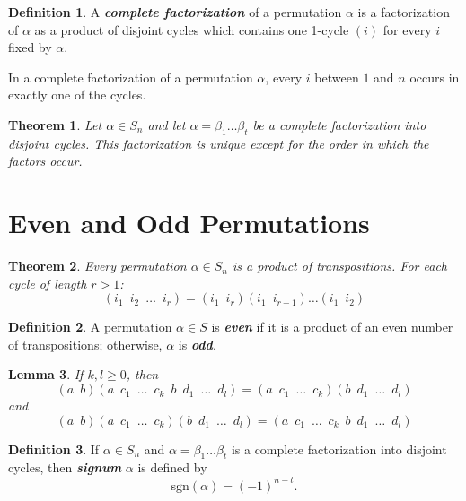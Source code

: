 \documentclass[12pt]{report}
\newtheorem{theorem}{Theorem}[chapter]
\newtheorem{lemma}[theorem]{Lemma}
\theoremstyle{definition}
\newtheorem*{definition}{Definition}
\newcommand{\term}[1]{\textbf{\textit{#1}}}
\begin{document}
\begin{definition}
	A \term{complete factorization} of a permutation $\alpha$ is a factorization of $\alpha$ as a product of disjoint cycles which contains one 1-cycle $(i)$ for every $i$ fixed by $\alpha$.
	\smallskip

	In a complete factorization of a permutation $\alpha$, every $i$ between $1$ and $n$ occurs in exactly one of the cycles.
\end{definition}

\begin{theorem}
	Let $\alpha\in S_n$ and let $\alpha=\beta_1\dots\beta_t$ be a complete factorization into disjoint cycles. This factorization is unique except for the order in which the factors occur.
\end{theorem}

\section{Even and Odd Permutations}
\begin{theorem}
	Every permutation $\alpha\in S_n$ is a product of transpositions. For each cycle of length $r>1$:
	\[ (i_1\enspace i_2\enspace\dots\enspace i_r)=(i_1\enspace i_r)(i_1\enspace i_{r-1})\dots(i_1\enspace i_2)\]
\end{theorem}

\begin{definition}
	A permutation $\alpha\in S$ is \term{even} if it is a product of an even number of transpositions; otherwise, $\alpha$ is \term{odd}.
\end{definition}

\begin{lemma}
	If $k, l\geq0$, then
	\[ (a\enspace b)(a\enspace c_1\enspace\dots\enspace c_k\enspace b\enspace d_1\enspace\dots\enspace d_l) = (a\enspace c_1\enspace\dots\enspace c_k)(b\enspace d_1\enspace\dots\enspace d_l) \]
	and
	\[ (a\enspace b)(a\enspace c_1\enspace\dots\enspace c_k)(b\enspace d_1\enspace\dots\enspace d_l) = (a\enspace c_1\enspace\dots\enspace c_k\enspace b\enspace d_1\enspace\dots\enspace d_l) \]
\end{lemma}

\begin{definition}
	If $\alpha\in S_n$ and $\alpha=\beta_1\dots\beta_t$ is a complete factorization into disjoint cycles, then \term{signum} $\alpha$ is defined by
	\[ \text{sgn}(\alpha) = (-1)^{n-t}. \]
\end{definition}
\end{document}
